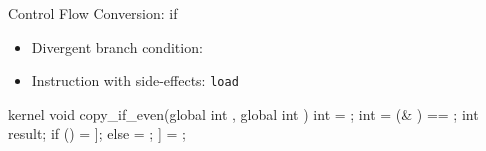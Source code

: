 \begin{frame}[fragile]{Control Flow Conversion: if}

\begin{minipage}[t]{0.50\linewidth}

\begin{itemize}
    \item Divergent branch condition: 
    \item Instruction with side-effects: \texttt{load}
\end{itemize}

\begin{codebox}[commandchars=\\\[\]]
kernel void copy_if_even(global int \uniform[*src],
                         global int \uniform[*dst]) {
  int \varying[tid] = ;
  int \varying[cond] = (\varying[tid] & \uniform[1]) == \uniform[0];
  int result;
  if (\varying[cond]) {
    \varying[result] = \uniform[src]\idx[\varying[tid]];
  } else {
    \uniform[result] = \uniform[-1];
  }
  \uniform[dst]\idx[\varying[tid]] = \varying[result];
}
\end{codebox}

\end{minipage}
\hspace{1em}
\begin{minipage}[t]{0.43\linewidth}

\vspace{0.1ex}


\end{minipage}

\end{frame}


